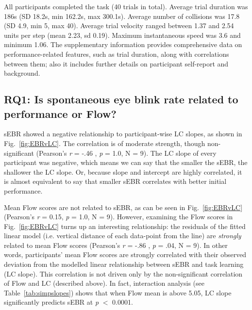 
All participants completed the task (40 trials in total). Average trial duration was 186s (SD 18.2s, min 162.2s, max 300.1s). Average number of collisions was 17.8 (SD 4.9, min 5, max 40). Average trial velocity ranged between 1.37 and 2.54 units per step (mean 2.23, sd 0.19). Maximum instantaneous speed was 3.6 and minimum 1.06. The supplementary information provides comprehensive data on performance-related features, such as trial duration, along with correlations between them; also it includes further details on participant self-report and background.

\subsection*{RQ1: Is spontaneous eye blink rate related to performance or Flow?}

sEBR showed a negative relationship to participant-wise LC slopes, as shown in Fig.~\ref{fig:EBRvLC}. The correlation is of moderate strength, though non-significant (Pearson's {\it r} = -.46 , {\it p} = 1.0, N = 9). %
The LC slope of every participant was negative, which means we can say that the smaller the sEBR, the shallower the LC slope. Or, because slope and intercept are highly correlated, it is almost equivalent to say that smaller sEBR correlates with better initial performance.

Mean Flow scores are not related to sEBR, as can be seen in Fig.~\ref{fig:EBRvLC} (Pearson's {\it r} = 0.15, {\it p} = 1.0, N = 9). %
However, examining the Flow scores in Fig.~\ref{fig:EBRvLC} turns up an interesting relationship: the residuals of the fitted linear model (i.e. vertical distance of each data-point from the line) are {\it strongly} related to mean Flow scores (Pearson's {\it r} = -.86 , {\it p} = .04, N = 9). %
In other words, participants' mean Flow scores are strongly correlated with their observed deviation from the modelled linear relationship between sEBR and task learning (LC slope). This correlation is not driven only by the non-significant correlation of Flow and LC (described above). In fact, interaction analysis (see Table~\ref{tab:simpslopes}) shows that when Flow mean is above 5.05, LC slope significantly predicts sEBR at {\it p} $<$ 0.0001.

